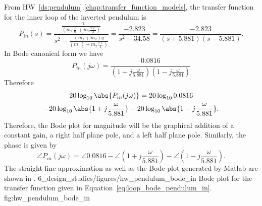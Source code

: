 From HW~\ref{ds:pendulum}.\ref{chap:transfer_function_models}, the transfer function for the inner loop of the inverted pendulum is 
\begin{equation}\label{eq:hw_pendulum_bode_in_tf}
P_{in}(s) = \frac{\frac{-1}{(m_1 \frac{\ell}{6}+ m_2 \frac{2 \ell}{3})}}{s^2-\frac{(m_1+m_2)g}{(m_1 \frac{\ell}{6}+ m_2 \frac{2 \ell}{3})}} = 
\frac{-2.823}{s^2 - 34.58} = \frac{-2.823}{(s+5.881)(s-5.881)}.  %
\end{equation}
In Bode canonical form we have
\[
P_{in}(j\omega) = \frac{0.0816}{(1+j\frac{\omega}{5.881})(1-j\frac{\omega}{5.881})}
\]
Therefore
\begin{multline} \label{eq:loop_bode_pendulum_in}
20\log_{10}\abs{P_{in}(j\omega)}=
	20\log_{10} 0.0816 \\
	-20\log_{10}\abs{1+j\frac{\omega}{5.881}}
	-20\log_{10}\abs{1-j\frac{\omega}{5.881}}.
\end{multline}
Therefore, the Bode plot for magnitude will be the graphical addition of a constant gain, a right half plane pole, and a left half plane pole.
Similarly, the phase is given by
\[
\angle P_{in}(j\omega) = 
	\angle 0.0816 
	- \angle (1+j\frac{\omega}{5.881})
	- \angle (1-j\frac{\omega}{5.881}).
\]
The straight-line approximation as well as the Bode plot generated by Matlab are shown in .
	{6_design_studies/figures/hw_pendulum_bode_in}
	{Bode plot for the transfer function given in Equation~\eqref{eq:loop_bode_pendulum_in}.}
	{fig:hw_pendulum_bode_in}
%

